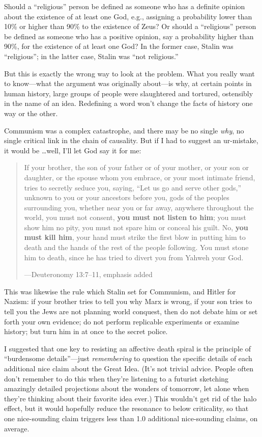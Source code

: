 {
 Should a ``religious'' person
be defined as someone who has a definite opinion about the existence of
at least one God, e.g., assigning a probability lower than 10\% or
higher than 90\% to the existence of Zeus? Or should a
``religious'' person be defined as
someone who has a positive opinion, say a probability higher than 90\%,
for the existence of at least one God? In the former case, Stalin was
``religious''; in the latter case,
Stalin was ``not religious.''}

{
 But this is exactly the wrong way to look at the problem. What you
really want to know---what the argument was originally about---is why,
at certain points in human history, large groups of people were
slaughtered and tortured, ostensibly in the name of an idea. Redefining
a word won't change the facts of history one way or the
other.}

{
 Communism was a complex catastrophe, and there may be no single
\textit{why}, no single critical link in the chain of causality. But if
I had to suggest an ur-mistake, it would be \ldots well,
I'll let God say it for me:}

\begin{quote}
{
 If your brother, the son of your father or of your mother, or your
son or daughter, or the spouse whom you embrace, or your most intimate
friend, tries to secretly seduce you, saying, ``Let us
go and serve other gods,'' unknown to you or your
ancestors before you, gods of the peoples surrounding you, whether near
you or far away, anywhere throughout the world, you must not consent,
\textbf{you must not listen to him}; you must show him no pity, you
must not spare him or conceal his guilt. No, \textbf{you must kill
him}, your hand must strike the first blow in putting him to death and
the hands of the rest of the people following. You must stone him to
death, since he has tried to divert you from Yahweh your God.}

{\raggedleft
 {}---Deuteronomy 13:7--11, emphasis added
\par}
\end{quote}

{
 This was likewise the rule which Stalin set for Communism, and
Hitler for Nazism: if your brother tries to tell you why Marx is wrong,
if your son tries to tell you the Jews are not planning world conquest,
then do not debate him or set forth your own evidence; do not perform
replicable experiments or examine history; but turn him in at once to
the secret police.}

{
 I suggested that one key to resisting an affective death spiral is
the principle of ``burdensome
details''---just \textit{remembering} to question the
specific details of each additional nice claim about the Great Idea.
(It's not trivial advice. People often
don't remember to do this when they're
listening to a futurist sketching amazingly detailed projections about
the wonders of tomorrow, let alone when they're
thinking about their favorite idea ever.) This wouldn't
get rid of the halo effect, but it would hopefully reduce the resonance
to below criticality, so that one nice-sounding claim triggers less
than 1.0 additional nice-sounding claims, on average.}

